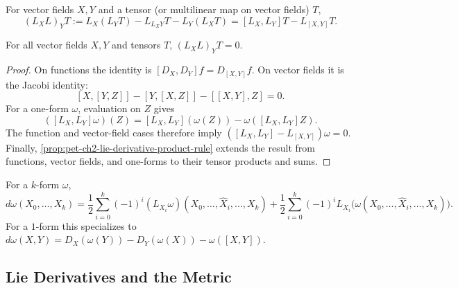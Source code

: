 \begin{definition}
  \label{def:pet-ch2-generalized-lie-derivative}


  For vector fields $X,Y$ and a tensor (or multilinear map on vector fields)
  $T$,
  \[
    (L_XL)_YT := L_X(L_YT)-L_{L_XY}T-L_Y(L_XT) = [L_X,L_Y]T-L_{[X,Y]}T.
  \]
\end{definition}

\begin{proposition}
  \label{prop:pet-ch2-generalized-jacobi-identity}


  For all vector fields $X,Y$ and tensors $T$, $(L_XL)_YT=0$.
\end{proposition}
\begin{proof}

  \sketch
  On functions the identity is
  $[D_X,D_Y]f=D_{[X,Y]}f$. On vector fields it is the Jacobi identity:
  \[
    [X,[Y,Z]]-[Y,[X,Z]]-[[X,Y],Z]=0.
  \]
  For a one-form $\omega$, evaluation on $Z$ gives
  \[
    ([L_X,L_Y]\omega)(Z)
      =[L_X,L_Y](\omega(Z))-\omega([L_X,L_Y]Z).
  \]
  The function and vector-field cases therefore imply
  $([L_X,L_Y]-L_{[X,Y]})\omega=0$. Finally,
  \cref{prop:pet-ch2-lie-derivative-product-rule} extends the result from
  functions, vector fields, and one-forms to their tensor products and sums.
\end{proof}

\begin{definition}
  \label{def:pet-ch2-exterior-derivative-lie-formula}


  For a $k$-form $\omega$,
  \[
    d\omega(X_0,\dots,X_k)
    =\frac12\sum_{i=0}^k(-1)^i(L_{X_i}\omega)(X_0,\dots,\hat X_i,\dots,X_k)
    +\frac12\sum_{i=0}^k(-1)^iL_{X_i}\big(\omega(X_0,\dots,\hat X_i,\dots,X_k)\big).
  \]
  For a $1$-form this specializes to
  $d\omega(X,Y)=D_X(\omega(Y))-D_Y(\omega(X))-\omega([X,Y])$.
\end{definition}

\subsection{Lie Derivatives and the Metric}

